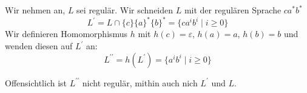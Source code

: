 \documentclass{article}
\begin{document}
      \subsection{} 

      Wir nehmen an, $L$ sei regulär. Wir schneiden $L$ mit der regulären Sprache
      ${c}{a}^*{b}^*$
      \begin{equation*}
         L^\prime = L \cap \{c\}\{a\}^*\{b\}^* = \{c a^i b^i \mid i \ge 0\}
      \end{equation*}
      Wir definieren 
      Homomorphismus $h$ mit $h(c) = \varepsilon$, $h(a) = a$, $h(b) = b$ und wenden
      diesen auf $L^\prime$ an:
      \begin{equation*}
         L^{\prime\prime} = h(L^\prime) = \{a^i b^i \mid i \ge 0\}
      \end{equation*}

      Offensichtlich ist $L^{\prime\prime}$ nicht regulär,  mithin auch nich
      $L^\prime$ und $L$.



      \subsection{} 
      
\end{document}
